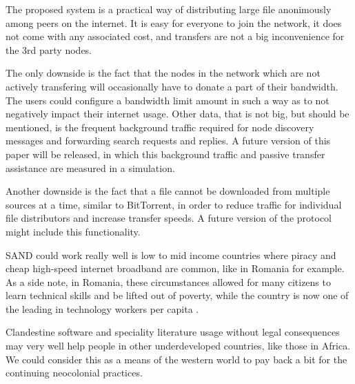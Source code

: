 The proposed system is a practical way of distributing large file anonimously 
among peers on the internet. It is easy for everyone to join the network, it 
does not come with any associated cost, and transfers are not a big 
inconvenience for the 3rd party nodes.

The only downside is the fact that the nodes in the network which are not 
actively transfering will occasionally have to donate a part of their 
bandwidth. The users could configure a bandwidth limit amount in such a way as 
to not negatively impact their internet usage. Other data, that is not big, but 
should be mentioned, is the frequent background traffic required for node 
discovery messages and forwarding search requests and replies. A future version 
of this paper will be released, in which this background traffic and passive 
transfer assistance are measured in a simulation.

Another downside is the fact that a file cannot be downloaded from multiple 
sources at a time, similar to BitTorrent, in order to reduce traffic for 
individual file distributors and increase transfer speeds. A future version of 
the protocol might include this functionality.

SAND could work really well is low to mid income countries where piracy and 
cheap high-speed internet broadband are common, like in Romania for example. As 
a side note, in Romania, these circumstances allowed for many citizens to learn 
technical skills and be lifted out of poverty, while the country is now one of 
the leading in technology workers per capita \cite{romaniasoftwaredev}.

Clandestine software and speciality literature usage without legal consequences 
may very well help people in other underdeveloped countries, like those in 
Africa. We could consider this as a means of the western world to pay back a 
bit for the continuing neocolonial practices.
